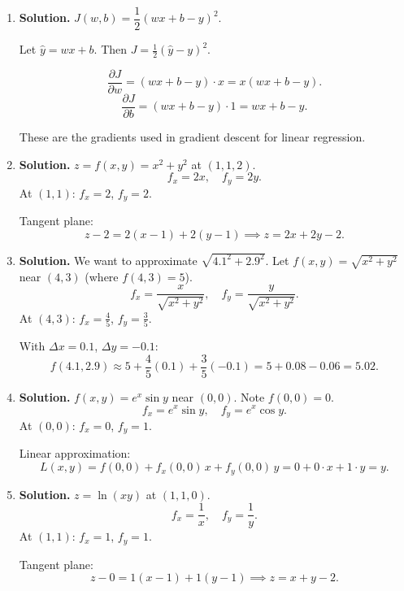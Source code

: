 \begin{enumerate}
As a unit vector, the direction of steepest temperature increase is $\boxed{\left\langle -\dfrac{1}{\sqrt{2}}, -\dfrac{1}{\sqrt{2}}\right\rangle}$, i.e., toward the origin. This makes physical sense: the temperature $T = e^{-x^2-y^2}$ is maximized at the origin, so at $(1,1)$ the temperature increases most rapidly toward the origin.

\item \textbf{Solution.}
$J(w,b) = \dfrac{1}{2}(wx + b - y)^2$.

Let $\hat{y} = wx + b$. Then $J = \frac{1}{2}(\hat{y} - y)^2$.

\[
\frac{\partial J}{\partial w} = (wx + b - y) \cdot x = \boxed{x(wx + b - y)}.
\]
\[
\frac{\partial J}{\partial b} = (wx + b - y) \cdot 1 = \boxed{wx + b - y}.
\]

These are the gradients used in gradient descent for linear regression.


\item \textbf{Solution.}
$z = f(x,y) = x^2 + y^2$ at $(1,1,2)$.
\[
f_x = 2x, \quad f_y = 2y.
\]
At $(1,1)$: $f_x = 2$, $f_y = 2$.

Tangent plane:
\[
z - 2 = 2(x-1) + 2(y-1) \implies \boxed{z = 2x + 2y - 2}.
\]

\item \textbf{Solution.}
We want to approximate $\sqrt{4.1^2 + 2.9^2}$. Let $f(x,y) = \sqrt{x^2+y^2}$ near $(4, 3)$ (where $f(4,3) = 5$).
\[
f_x = \frac{x}{\sqrt{x^2+y^2}}, \quad f_y = \frac{y}{\sqrt{x^2+y^2}}.
\]
At $(4,3)$: $f_x = \frac{4}{5}$, $f_y = \frac{3}{5}$.

With $\Delta x = 0.1$, $\Delta y = -0.1$:
\[
f(4.1, 2.9) \approx 5 + \frac{4}{5}(0.1) + \frac{3}{5}(-0.1) = 5 + 0.08 - 0.06 = \boxed{5.02}.
\]

\item \textbf{Solution.}
$f(x,y) = e^x\sin y$ near $(0,0)$. Note $f(0,0) = 0$.
\[
f_x = e^x\sin y, \quad f_y = e^x\cos y.
\]
At $(0,0)$: $f_x = 0$, $f_y = 1$.

Linear approximation:
\[
L(x,y) = f(0,0) + f_x(0,0)\,x + f_y(0,0)\,y = 0 + 0 \cdot x + 1 \cdot y = \boxed{y}.
\]

\item \textbf{Solution.}
$z = \ln(xy)$ at $(1,1,0)$.
\[
f_x = \frac{1}{x}, \quad f_y = \frac{1}{y}.
\]
At $(1,1)$: $f_x = 1$, $f_y = 1$.

Tangent plane:
\[
z - 0 = 1(x - 1) + 1(y - 1) \implies \boxed{z = x + y - 2}.
\]


\end{enumerate}
